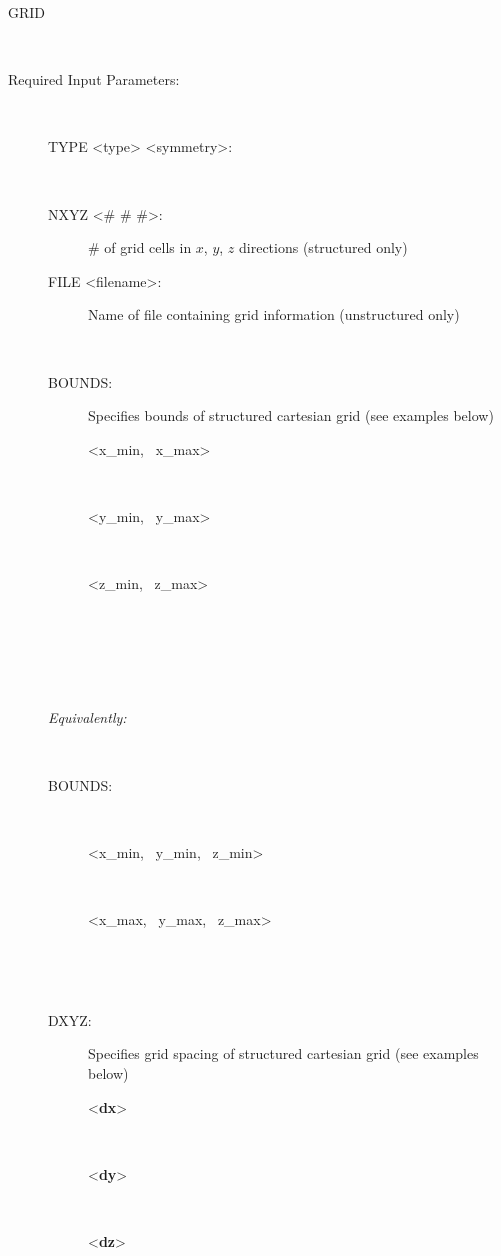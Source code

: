 \begin{description}
\item[GRID]~
\item[Required Input Parameters:]~

\begin{description}
\item[TYPE <type> <symmetry>:] ~


\item[NXYZ <\# \# \#>:] \# of grid cells in $x$, $y$, $z$ directions (structured only)

\item[FILE <filename>:] Name of file containing grid information (unstructured only)

~\\

\item[BOUNDS:] Specifies bounds of structured cartesian grid (see examples below)
\begin{description}
\item[<x\_min, \ x\_max>]~
\item[<y\_min, \ y\_max>]~
\item[<z\_min, \ z\_max>]~
\end{description}
\item[\keyend] ~

~\\

\noindent
\item[\em Equivalently:] ~
\item[BOUNDS:] ~
\begin{description}
\item[<x\_min, \ y\_min, \ z\_min>]~
\item[<x\_max, \ y\_max, \ z\_max>]~
\end{description}
\item[\keyend] ~

\item[DXYZ:] Specifies grid spacing of structured cartesian grid (see examples below)
\begin{description}
\item[<{\bf dx}>] ~
\item[<{\bf dy}>] ~
\item[<{\bf dz}>] ~
\end{description}
\item[\keyend] ~
\end{description}


\end{description}
